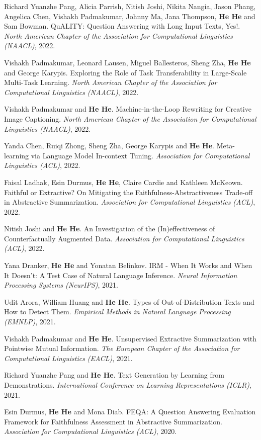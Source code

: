 Richard Yuanzhe Pang, Alicia Parrish, Nitish Joshi, Nikita Nangia, Jason Phang, Angelica Chen, Vishakh Padmakumar, Johnny Ma, Jana Thompson, \textbf{He He} and Sam Bowman. {QuALITY}: Question Answering with Long Input Texts, Yes!. \textit{North American Chapter of the Association for Computational Linguistics (NAACL)}, 2022.

Vishakh Padmakumar, Leonard Lausen, Miguel Ballesteros, Sheng Zha, \textbf{He He} and George Karypis. Exploring the Role of Task Transferability in Large-Scale Multi-Task Learning. \textit{North American Chapter of the Association for Computational Linguistics (NAACL)}, 2022.

Vishakh Padmakumar and \textbf{He He}. Machine-in-the-Loop Rewriting for Creative Image Captioning. \textit{North American Chapter of the Association for Computational Linguistics (NAACL)}, 2022.

Yanda Chen, Ruiqi Zhong, Sheng Zha, George Karypis and \textbf{He He}. Meta-learning via Language Model In-context Tuning. \textit{Association for Computational Linguistics (ACL)}, 2022.

Faisal Ladhak, Esin Durmus, \textbf{He He}, Claire Cardie and Kathleen McKeown. Faithful or Extractive? On Mitigating the Faithfulness-Abstractiveness Trade-off in Abstractive Summarization. \textit{Association for Computational Linguistics (ACL)}, 2022.

Nitish Joshi and \textbf{He He}. An Investigation of the (In)effectiveness of Counterfactually Augmented Data. \textit{Association for Computational Linguistics (ACL)}, 2022.

Yana Dranker, \textbf{He He} and Yonatan Belinkov. {IRM} - When It Works and When It Doesn't: A Test Case of Natural Language Inference. \textit{Neural Information Processing Systems (NeurIPS)}, 2021.

Udit Arora, William Huang and \textbf{He He}. Types of Out-of-Distribution Texts and How to Detect Them. \textit{Empirical Methods in Natural Language Processing (EMNLP)}, 2021.

Vishakh Padmakumar and \textbf{He He}. Unsupervised Extractive Summarization with Pointwise Mutual Information. \textit{The European Chapter of the Association for Computational Linguistics (EACL)}, 2021.

Richard Yuanzhe Pang and \textbf{He He}. Text Generation by Learning from Demonstrations. \textit{International Conference on Learning Representations (ICLR)}, 2021.

Esin Durmus, \textbf{He He} and Mona Diab. FEQA: A Question Answering Evaluation Framework for Faithfulness Assessment in Abstractive Summarization. \textit{Association for Computational Linguistics (ACL)}, 2020.

